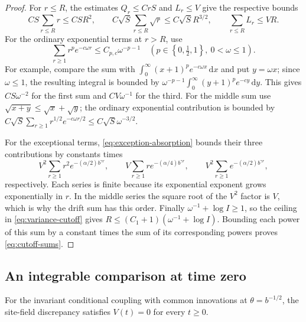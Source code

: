 \begin{proof}
For $r\le R$, the estimates $Q_r\le CrS$ and $L_r\le V$ give
the respective bounds
\[
 CS\sum_{r\le R}r\le CSR^2,
 \qquad C\sqrt S\sum_{r\le R}\sqrt r\le C\sqrt S R^{3/2},
 \qquad \sum_{r\le R}L_r\le VR.
\]
For the ordinary exponential terms at $r>R$, use
\begin{equation}
 \sum_{r\ge1}r^p e^{-c\omega r}
 \le C_{p,c}\omega^{-p-1}
 \quad\left(p\in\left\{0,\tfrac12,1\right\},\ 0<\omega\le1\right).
 \label{eq:exponential-length-sums}
\end{equation}
For example, compare the sum with
$\int_0^\infty(x+1)^p e^{-c\omega x}\,\mathrm dx$ and put
$y=\omega x$; since $\omega\le1$, the resulting integral is bounded
by $\omega^{-p-1}\int_0^\infty(y+1)^p e^{-cy}\,\mathrm dy$.
This gives $CS\omega^{-2}$ for the first sum and $CV\omega^{-1}$
for the third.  For the middle sum use
$\sqrt{x+y}\le\sqrt x+\sqrt y$; the ordinary exponential contribution
is bounded by $C\sqrt S\sum_{r\ge1}r^{1/2}e^{-c\omega r/2}
\le C\sqrt S\omega^{-3/2}$.

For the exceptional terms, \eqref{eq:exception-absorption} bounds
their three contributions by constants times
\[
 V^2\sum_{r\ge1}r^2e^{-(\alpha/2)b^{\gamma r}},\qquad
 V\sum_{r\ge1}r e^{-(\alpha/4)b^{\gamma r}},\qquad
 V^2\sum_{r\ge1}e^{-(\alpha/2)b^{\gamma r}},
\]
respectively.  Each series is finite because its exponential exponent
grows exponentially in $r$.  In the middle series the square root of
the $V^2$ factor is $V$, which is why the drift sum has this order.
Finally $\omega^{-1}+\log I\ge1$, so the ceiling in
\eqref{eq:variance-cutoff} gives
$R\le(C_1+1)(\omega^{-1}+\log I)$.
Bounding each power of this sum by a constant times the sum of its
corresponding powers proves \eqref{eq:cutoff-sums}.
\end{proof}

\subsection{An integrable comparison at time zero}

\begin{proposition}
\label{prop:critical-uniqueness}
For the invariant conditional coupling with common innovations at
$\theta=b^{-1/2}$, the site-field discrepancy satisfies
$V(t)=0$ for every $t\ge0$.
\end{proposition}

